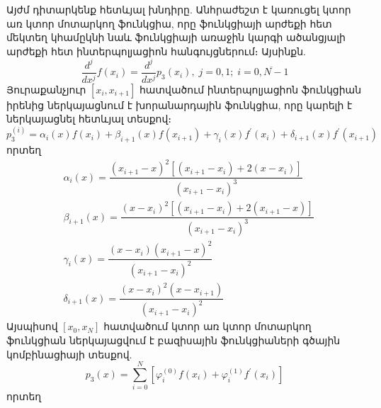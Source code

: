\documentclass[fleqn, bachelor,subf,12pt,notitlepage]{article}
\begin{document}
Այժմ դիտարկենք հետևյալ խնդիրը.
Անհրաժեշտ է կառուցել  կտոր առ կտոր մոտարկող ֆունկցիա, որը ֆունկցիայի արժեքի հետ մեկտեղ կհամըկնի նաև ֆունկցիայի առաջին կարգի ածանցյալի արժեքի հետ ինտերպոլյացիոն հանգույցներում։ Այսինքն.
\begin{equation}
\dfrac{d^{j}}{dx^j}f(x_{i})=\dfrac{d^{j}}{dx^j}p_{3}(x_{i}),   \; j=0, 1;  \; i=\overline{0, N-1}
\end{equation}
Յուրաքանչյուր $\left[x_{i}, x_{i+1}\right]$ հատվածում ինտերպոլյացիոն ֆունկցիան իրենից ներկայացնում է խորանարդային ֆունկցիա, որը կարելի է ներկայացնել հետևյալ տեսքով։
\begin{equation}
p_{3}^{\left(i\right)} = \alpha_{i}(x)f(x_{i})+\beta_{i+1}(x)f(x_{i+1})+\gamma_{i}(x)f^{'}(x_{i})+\delta_{i+1}(x)f^{'}(x_{i+1})
\end{equation}
որտեղ 
\begin{equation}
\begin{aligned}
&\alpha_{i}(x)=\dfrac{\left(x_{i+1}-x\right)^{2}\left[\left(x_{i+1}-x_{i}\right)+2\left(x-x_{i}\right)\right]}{\left(x_{i+1}-x_{i}\right)^{3}}\\
&\beta_{i+1}(x)=\dfrac{\left(x-x_{i}\right)^{2}\left[\left(x_{i+1}-x_{i}\right)+2\left(x_{i+1}-x\right)\right]}{\left(x_{i+1}-x_{i}\right)^{3}}\\
&\gamma_{i}(x)=\dfrac{\left(x-x_{i}\right)\left(x_{i+1}-x\right)^{2}}{\left(x_{i+1}-x_{i}\right)^{2}}\\
&\delta_{i+1}(x)=\dfrac{\left(x-x_{i}\right)^2\left(x-x_{i+1}\right)}{\left(x_{i+1}-x_{i}\right)^{2}}
\end{aligned}
\end{equation}
Այսպիսով $\left[x_{0}, x_{N}\right]$ հատվածում կտոր առ կտոր մոտարկող ֆունկցիան ներկայացվում է բազիսային ֆունկցիաների գծային կոմբինացիայի տեսքով.
\begin{equation}
p_{3}(x)=\sum_{i=0}^{N}\left[\varphi_{i}^{(0)}f(x_{i})+\varphi_{i}^{(1)}f^{'}(x_{i})\right]
\end{equation}
որտեղ 
\end{document}
